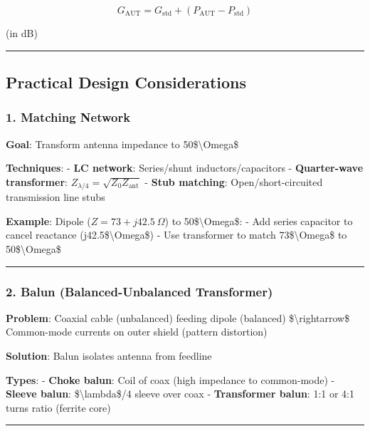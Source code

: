 \[
G_{\text{AUT}} = G_{\text{std}} + (P_{\text{AUT}} - P_{\text{std}})
\]

(in dB)

\begin{center}\rule{0.5\linewidth}{0.5pt}\end{center}

\subsection{Practical Design
Considerations}\label{practical-design-considerations}

\subsubsection{1. Matching Network}\label{matching-network}

\textbf{Goal}: Transform antenna impedance to 50\$\textbackslash Omega\$

\textbf{Techniques}: - \textbf{LC network}: Series/shunt
inductors/capacitors - \textbf{Quarter-wave transformer}:
\(Z_{\lambda/4} = \sqrt{Z_0 Z_{\text{ant}}}\) - \textbf{Stub matching}:
Open/short-circuited transmission line stubs

\textbf{Example}: Dipole (\(Z = 73 + j42.5\ \Omega\)) to
50\$\textbackslash Omega\$: - Add series capacitor to cancel reactance
(j42.5\$\textbackslash Omega\$) - Use transformer to match
73\$\textbackslash Omega\$ to 50\$\textbackslash Omega\$

\begin{center}\rule{0.5\linewidth}{0.5pt}\end{center}

\subsubsection{2. Balun (Balanced-Unbalanced
Transformer)}\label{balun-balanced-unbalanced-transformer}

\textbf{Problem}: Coaxial cable (unbalanced) feeding dipole (balanced)
\$\textbackslash rightarrow\$ Common-mode currents on outer shield
(pattern distortion)

\textbf{Solution}: Balun isolates antenna from feedline

\textbf{Types}: - \textbf{Choke balun}: Coil of coax (high impedance to
common-mode) - \textbf{Sleeve balun}: \$\textbackslash lambda\$/4 sleeve
over coax - \textbf{Transformer balun}: 1:1 or 4:1 turns ratio (ferrite
core)

\begin{center}\rule{0.5\linewidth}{0.5pt}\end{center}

